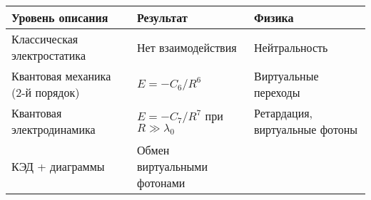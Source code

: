 \documentclass[11pt]{article}
\begin{document}
\begin{longtable}[]{@{}lll@{}}
\toprule
\begin{minipage}[b]{0.24\columnwidth}\raggedright\strut
Уровень описания\strut
\end{minipage} & \begin{minipage}[b]{0.13\columnwidth}\raggedright\strut
Результат\strut
\end{minipage} & \begin{minipage}[b]{0.11\columnwidth}\raggedright\strut
Физика\strut
\end{minipage}\tabularnewline
\midrule
\endhead
\begin{minipage}[t]{0.24\columnwidth}\raggedright\strut
Классическая электростатика\strut
\end{minipage} & \begin{minipage}[t]{0.13\columnwidth}\raggedright\strut
Нет взаимодействия\strut
\end{minipage} & \begin{minipage}[t]{0.11\columnwidth}\raggedright\strut
Нейтральность\strut
\end{minipage}\tabularnewline
\begin{minipage}[t]{0.24\columnwidth}\raggedright\strut
Квантовая механика (2-й порядок)\strut
\end{minipage} & \begin{minipage}[t]{0.13\columnwidth}\raggedright\strut
\(E = -C_6/R^6\)\strut
\end{minipage} & \begin{minipage}[t]{0.11\columnwidth}\raggedright\strut
Виртуальные переходы\strut
\end{minipage}\tabularnewline
\begin{minipage}[t]{0.24\columnwidth}\raggedright\strut
Квантовая электродинамика\strut
\end{minipage} & \begin{minipage}[t]{0.13\columnwidth}\raggedright\strut
\(E = -C_7/R^7\) при \(R \gg \lambda_0\)\strut
\end{minipage} & \begin{minipage}[t]{0.11\columnwidth}\raggedright\strut
Ретардация, виртуальные фотоны\strut
\end{minipage}\tabularnewline
\begin{minipage}[t]{0.24\columnwidth}\raggedright\strut
КЭД + диаграммы\strut
\end{minipage} & \begin{minipage}[t]{0.13\columnwidth}\raggedright\strut
Обмен виртуальными фотонами\strut

\end{minipage}
\end{longtable}
\end{document}
